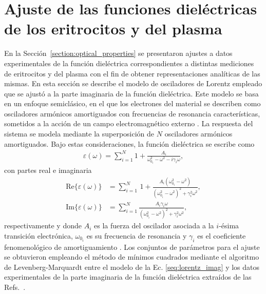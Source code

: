 

\chapter{Ajuste de las funciones dieléctricas de los eritrocitos y del plasma}

\label{section:apendix1}

En la Sección~\ref{section:optical_properties} se presentaron ajustes a datos experimentales de la función dieléctrica correspondientes a distintas mediciones de eritrocitos y del plasma con el fin de obtener representaciones analíticas de las mismas. En esta sección se describe el modelo de osciladores de Lorentz empleado que se ajustó a la parte imaginaria de la función dieléctrica. Este modelo se basa en un enfoque semiclásico, en el que los electrones del material se describen como osciladores armónicos amortiguados con frecuencias de resonancia características, sometidos a la acción de un campo electromagnético externo \cite{bohrenAbsorptionScatteringLight2008}. La respuesta del sistema se modela mediante la superposición de $N$ osciladores armónicos amortiguados. Bajo estas consideraciones, la función dieléctrica se escribe como \cite{bohrenAbsorptionScatteringLight2008}
%
\begin{align}
	\varepsilon(\omega)=\sum_{i=1}^N 1 + \frac{A_i }{\omega_{0_{i}}^2-\omega^2 - i \gamma_i \omega},
\end{align}
%
con partes real e imaginaria \cite{bohrenAbsorptionScatteringLight2008}
%
\begin{align}
	\text{Re}\{\varepsilon(\omega)\}&=\sum_{i=1}^N\, 1+\frac{A_i (\omega_{0_{i}}^2-\omega^2)}{(\omega_{0_{i}}^2-\omega^2)^2 + \gamma_i^2 \omega^2},\\
	\text{Im}\{\varepsilon(\omega)\}&=\sum_{i=1}^N \frac{A_i \gamma_i \omega}{(\omega_{0_{i}}^2-\omega^2)^2 + \gamma_i^2 \omega^2}, \label{seq:lorentz_imag}
\end{align}
%
respectivamente y donde $A_i$ es la fuerza del oscilador asociada a la $i$-ésima transición electrónica, $\omega_{0_{i}}$ es su frecuencia de resonancia y $\gamma_i$ es el coeficiente fenomenológico de amortiguamiento \cite{kreibigOpticalPropertiesMetal2013}. Los conjuntos de parámetros para el ajuste se obtuvieron empleando el método de mínimos cuadrados mediante el algoritmo de Levenberg-Marquardt \cite{pressNumericalRecipesArt2007} entre el modelo de la Ec. \eqref{seq:lorentz_imag}  y los datos experimentales de la parte imaginaria de la función dieléctrica extraídos de las Refs.~\cite{friebelModelFunctionCalculate2006,friebelDeterminationComplexRefractive2005,friebelDeterminationComplexRefractive2005,meinkeOpticalPropertiesPlatelets2007}.

